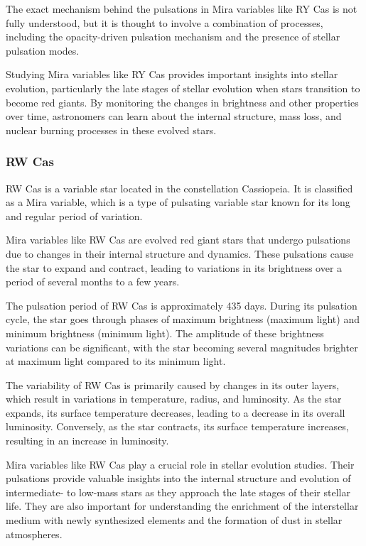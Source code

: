 The exact mechanism behind the pulsations in Mira variables like RY Cas is not fully understood, but it is thought to involve a combination of processes, including the opacity-driven pulsation mechanism and the presence of stellar pulsation modes.

Studying Mira variables like RY Cas provides important insights into stellar evolution, particularly the late stages of stellar evolution when stars transition to become red giants. By monitoring the changes in brightness and other properties over time, astronomers can learn about the internal structure, mass loss, and nuclear burning processes in these evolved stars.

\subsubsection*{ RW Cas }
RW Cas is a variable star located in the constellation Cassiopeia. It is classified as a Mira variable, which is a type of pulsating variable star known for its long and regular period of variation.

Mira variables like RW Cas are evolved red giant stars that undergo pulsations due to changes in their internal structure and dynamics. These pulsations cause the star to expand and contract, leading to variations in its brightness over a period of several months to a few years.

The pulsation period of RW Cas is approximately 435 days. During its pulsation cycle, the star goes through phases of maximum brightness (maximum light) and minimum brightness (minimum light). The amplitude of these brightness variations can be significant, with the star becoming several magnitudes brighter at maximum light compared to its minimum light.

The variability of RW Cas is primarily caused by changes in its outer layers, which result in variations in temperature, radius, and luminosity. As the star expands, its surface temperature decreases, leading to a decrease in its overall luminosity. Conversely, as the star contracts, its surface temperature increases, resulting in an increase in luminosity.

Mira variables like RW Cas play a crucial role in stellar evolution studies. Their pulsations provide valuable insights into the internal structure and evolution of intermediate- to low-mass stars as they approach the late stages of their stellar life. They are also important for understanding the enrichment of the interstellar medium with newly synthesized elements and the formation of dust in stellar atmospheres.

